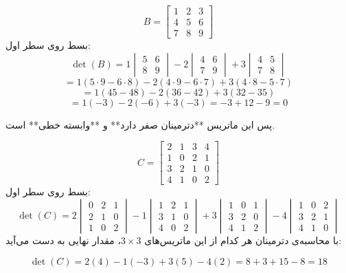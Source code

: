 	\begin{example}
			\[
		B =
		\begin{bmatrix}
			1 & 2 & 3 \\
			4 & 5 & 6 \\
			7 & 8 & 9
		\end{bmatrix}
		\]
		بسط روی سطر اول:
		\[
		\det(B) = 1 
		\begin{vmatrix}
			5 & 6 \\
			8 & 9
		\end{vmatrix}
		- 2 
		\begin{vmatrix}
			4 & 6 \\
			7 & 9
		\end{vmatrix}
		+ 3 
		\begin{vmatrix}
			4 & 5 \\
			7 & 8
		\end{vmatrix}
		\]
		\[
		= 1(5 \cdot 9 - 6 \cdot 8) - 2(4 \cdot 9 - 6 \cdot 7) + 3(4 \cdot 8 - 5 \cdot 7)
		\]
		\[
		= 1(45 - 48) - 2(36 - 42) + 3(32 - 35)
		\]
		\[
		= 1(-3) - 2(-6) + 3(-3) = -3 + 12 - 9 = 0
		\]
	\end{example}
	پس این ماتریس **دترمینان صفر دارد** و **وابسته خطی** است.
	\begin{example}

	\[
	C =
	\begin{bmatrix}
		2 & 1 & 3 & 4 \\
		1 & 0 & 2 & 1 \\
		3 & 2 & 1 & 0 \\
		4 & 1 & 0 & 2
	\end{bmatrix}
	\]
	بسط روی سطر اول:
	\[
	\det(C) =
	2
	\begin{vmatrix}
		0 & 2 & 1 \\
		2 & 1 & 0 \\
		1 & 0 & 2
	\end{vmatrix}
	- 1
	\begin{vmatrix}
		1 & 2 & 1 \\
		3 & 1 & 0 \\
		4 & 0 & 2
	\end{vmatrix}
	+ 3
	\begin{vmatrix}
		1 & 0 & 1 \\
		3 & 2 & 0 \\
		4 & 1 & 2
	\end{vmatrix}
	- 4
	\begin{vmatrix}
		1 & 0 & 2 \\
		3 & 2 & 1 \\
		4 & 1 & 0
	\end{vmatrix}
	\]
	با محاسبه‌ی دترمینان هر کدام از این ماتریس‌های \(3 \times 3\)، مقدار نهایی به دست می‌آید:
	
	\[
	\det(C) = 2(4) - 1(-3) + 3(5) - 4(2) = 8 + 3 + 15 - 8 = 18
	\]
\end{example}
